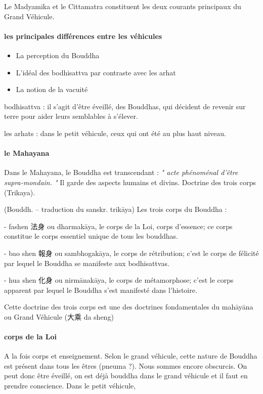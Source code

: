  Le Madyamika et le Cittamatra constituent les deux courants principaux du Grand Véhicule.

\paragraph{les principales différences entre les véhicules}

\begin{itemize}
    \item  La perception du Bouddha
   \item L’idéal des bodhisattva par contraste avec les arhat
   \item 	La notion de la vacuité
\end{itemize}


bodhisattva : il s'agit d'être éveillé, des Bouddhas, qui décident de revenir sur terre pour aider leurs semblables à s'élever.

les arhats : dans le petit véhicule, ceux qui ont été au plus haut niveau. 

\paragraph{le Mahayana}

Dans le Mahayana, le Bouddha est transcendant : \textit{" acte phénoménal d'être supra-mondain. "} Il garde des aspects humains et divins. Doctrine des trois corps (Trikaya). 

\begin{Def}[sanshen 三身]
    (Bouddh. – traduction du sanskr. trikāya)	Les trois corps du Bouddha :	
    
    - fashen 法身 ou dharmakāya, le corps de la Loi, corps d’essence; ce corps constitue le corps essentiel unique de tous les bouddhas. 
    
    - bao shen 報身 ou sambhogakāya, le corps de rétribution; c’est le corps de félicité par lequel le Bouddha se manifeste aux bodhisattvas. 
    
    - hua shen 化身 ou nirmānakāya, le corps de métamorphose; c’est le corps apparent par lequel le Bouddha s’est manifesté dans l’histoire. 
    
    Cette doctrine des trois corps est une des doctrines fondamentales du mahāyāna ou Grand Véhicule (大乘 da sheng) 
\end{Def}


\paragraph{corps de la Loi} A la fois corps et enseignement. Selon le grand véhicule, cette nature de Bouddha est présent dans tous les êtres (pneuma ?). Nous sommes encore obscurcis. On peut donc être éveillé, on est déjà bouddha dans le grand véhicule et il faut en prendre conscience. Dans le petit véhicule, 


